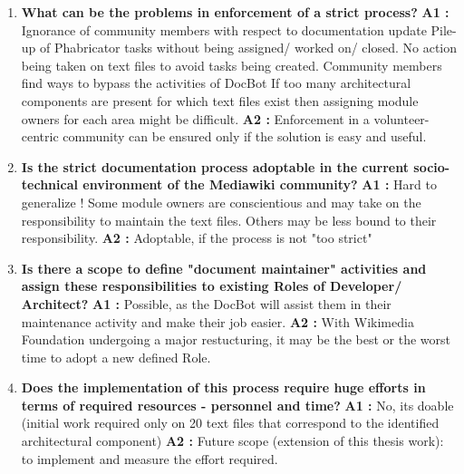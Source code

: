 \begin{enumerate}
\item \textbf{What can be the problems in enforcement of a strict process?}
\newline \textbf{A1 :} Ignorance of community members with respect to documentation update
\newline Pile-up of Phabricator tasks without being assigned/ worked on/ closed.
\newline No action being taken on text files to avoid tasks being created.
\newline Community members find ways to bypass the activities of DocBot
\newline If too many architectural components are present for which text files exist then assigning module owners for each area might be difficult.
\newline \textbf{A2 :} Enforcement in a volunteer-centric community can be ensured only if the solution is easy and useful.
\item \textbf{Is the strict documentation process adoptable in the current socio-technical environment of the Mediawiki community?}
\newline \textbf{A1 :} Hard to generalize !
\newline Some module owners are conscientious and may take on the responsibility to maintain the text files.
\newline Others may be less bound to their responsibility.
\newline \textbf{A2 :} Adoptable, if the process is not "too strict"
\item \textbf{Is there a scope to define "document maintainer" activities and assign these responsibilities to existing Roles of Developer/ Architect? }
\newline \textbf{A1 :} Possible, as the DocBot will assist them in their maintenance activity and make their job easier.
\newline \textbf{A2 :} With Wikimedia Foundation undergoing a major restucturing, it may be the best or the worst time to adopt a new defined Role.
\item \textbf{Does the implementation of this process require huge efforts in terms of required resources - personnel and time? }
\newline \textbf{A1 :} No, its doable (initial work required only on 20 text files that correspond to the identified architectural component)
\newline \textbf{A2 :} Future scope (extension of this thesis work): to implement and measure the effort required.

\end{enumerate}
